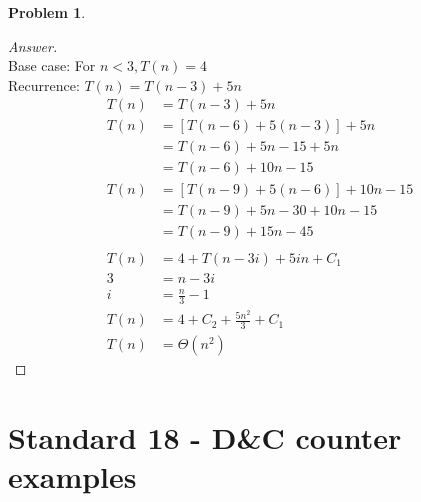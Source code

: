 \documentclass[11pt]{article}
\theoremstyle{definition}
\theoremstyle{definition}
\newtheorem{required}{Problem}
\theoremstyle{definition}
\begin{document}
\begin{required}
\begin{enumerate} [label=(\alph*)]
\begin{proof}[Answer] $ $ \\
Base case: For $ n<3, T(n) = 4$ \\
Recurrence: $T(n) =T(n-3)+5n$ 
\begin{align*}
    T(n) &= T(n-3)+5n \\
    T(n) &= [T(n-6)+5(n-3)]+ 5n \\
    &= T(n-6) +5n - 15 + 5n \\
    &= T(n-6) +10n - 15 \\
    T(n) &= [T(n-9) + 5(n-6)] + 10n - 15 \\
    &= T(n-9) + 5n  -30 + 10n - 15\\
    &= T(n-9) + 15n -45 \\ \\
    T(n) &= 4 + T(n-3i) + 5in + C_1 \\
    3 &= n-3i \\
    i &= \frac{n}{3} -1 \\
    T(n) &= 4 + C_2 + \frac{5n^2}{3} + C_1 \\
    T(n) &= \Theta (n^2)
\end{align*}
\end{proof}
\end{enumerate}

\end{required}
\newpage
\section{Standard 18 - D\&C counter examples}
\end{document}
